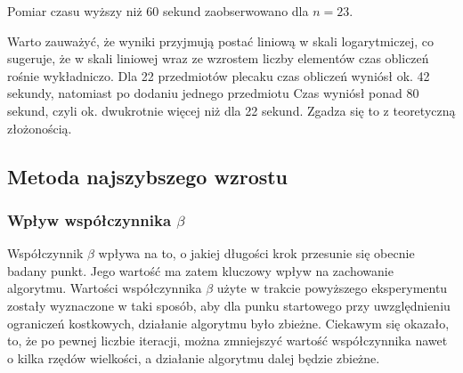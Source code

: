     Pomiar czasu wyższy niż 60 sekund zaobserwowano dla $n=23$.

	Warto zauważyć, że wyniki przyjmują postać liniową w skali logarytmiczej, co sugeruje, że w skali liniowej wraz ze wzrostem liczby elementów czas obliczeń rośnie wykładniczo. Dla 22 przedmiotów plecaku czas obliczeń wyniósł ok. 42 sekundy, natomiast po dodaniu jednego przedmiotu Czas wyniósł ponad 80 sekund, czyli ok. dwukrotnie więcej niż dla 22 sekund. Zgadza się to z teoretyczną złożonością.	

    
    \subsection{Metoda najszybszego wzrostu}

	\subsubsection{Wpływ współczynnika $\beta$}
	Współczynnik $\beta$ wpływa na to, o jakiej długości krok przesunie się obecnie badany punkt. Jego wartość ma zatem kluczowy wpływ na zachowanie algorytmu.
	Wartości współczynnika $\beta$ użyte w trakcie powyższego eksperymentu zostały wyznaczone w taki sposób, aby dla punku startowego przy uwzględnieniu ograniczeń kostkowych, działanie algorytmu było zbieżne. Ciekawym się okazało, to, że po pewnej liczbie iteracji, można zmniejszyć wartość współczynnika nawet o kilka rzędów wielkości, a działanie algorytmu dalej będzie zbieżne.

